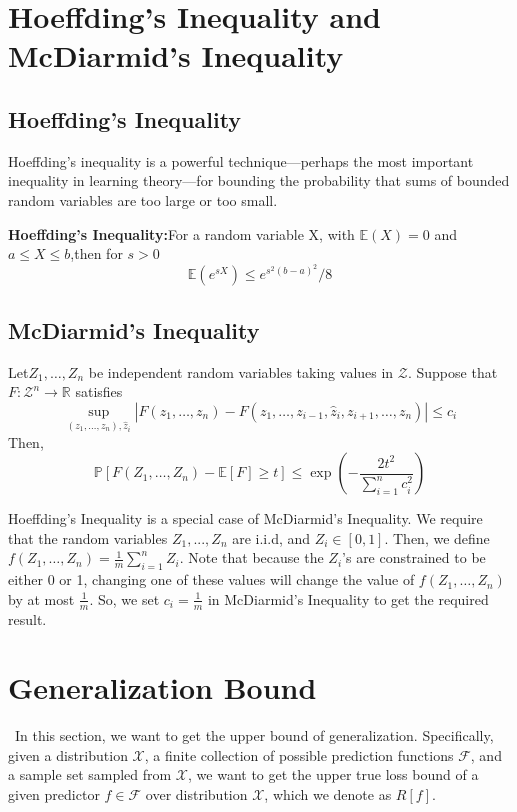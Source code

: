 \documentclass{article}[12pt]
\begin{document}
\section{Hoeffding's Inequality and McDiarmid's Inequality}

\subsection{Hoeffding's Inequality}

Hoeffding’s inequality is a powerful technique—perhaps the most important
inequality in learning theory—for bounding the probability that sums of
bounded random variables are too large or too small.

\textbf{Hoeffding's Inequality:}For a random variable X, with $\mathbb{E}(X)=0$ and $a\leq X\leq b$,then for $s > 0$
\begin{equation*}
    \mathbb{E}(e^{sX}) \leq e^{s^2(b-a)^2}/8
\end{equation*}

\subsection{McDiarmid's Inequality\cite{mcdiarmid_1989}}
Let$Z_1,\ldots, Z_n$ be independent random variables taking values in $\mathcal{Z}$. Suppose that $F: \mathcal{Z}^n \rightarrow \mathbb{R}$ satisfies
\begin{equation*}
    \sup_{(z_1,\ldots,z_n),\hat z_i} |F(z_1, \ldots, z_n)-F(z_1,\ldots,z_{i-1},\hat z_i, z_{i+1},\ldots,z_n)| \leq c_i
\end{equation*}
Then, 
\begin{equation}
    \mathbb{P}[F(Z_1,\ldots,Z_n)-\mathbb{E}[F]\geq t] \leq \exp{(-\frac{2t^2}{\sum_{i=1}^n c_i^2})}
\end{equation}


Hoeffding’s Inequality is a special case of McDiarmid’s Inequality. We require that the
random variables $Z_1, . . . , Z_n$ are i.i.d, and $Z_i \in [0,1]$. Then, we define $f(Z_1, \ldots , Z_n) = \frac{1}{m}\sum_{i=1}^n Z_i$. Note that because the $Z_i$’s are constrained to be either 0 or 1, changing one of these values will change the value of $f(Z_1, \ldots, Z_n)$ by at most $\frac{1}{m}$. So, we set $c_i =\frac{1}{m}$ in
McDiarmid’s Inequality to get the required result.


\section{Generalization Bound}
\
\indent In this section, we want to get the upper bound of generalization. Specifically, given a distribution $\mathcal{X}$, a finite collection of possible prediction functions $\mathcal{F}$, and a sample set sampled from $\mathcal{X}$, we want to get the upper true loss bound of a given predictor $f \in \mathcal{F}$ over distribution $\mathcal{X}$, which we denote as $R[f]$.
\end{document}
